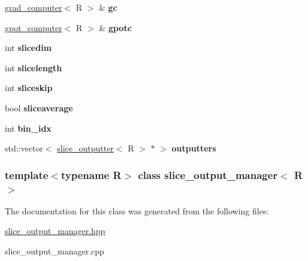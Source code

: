\begin{DoxyCompactItemize}
\item 
\hypertarget{classslice__output__manager_aef9191da41665323b7b552c1cac39025}{
\hyperlink{classgrad__computer}{grad\_\-computer}$<$ R $>$ \& {\bfseries gc}}
\label{classslice__output__manager_aef9191da41665323b7b552c1cac39025}

\item 
\hypertarget{classslice__output__manager_a4c23fefda63c2c5cb29f73d73374913e}{
\hyperlink{classgpot__computer}{gpot\_\-computer}$<$ R $>$ \& {\bfseries gpotc}}
\label{classslice__output__manager_a4c23fefda63c2c5cb29f73d73374913e}

\item 
\hypertarget{classslice__output__manager_ab53afdf80adec6a9a06869a11a9c6394}{
int {\bfseries slicedim}}
\label{classslice__output__manager_ab53afdf80adec6a9a06869a11a9c6394}

\item 
\hypertarget{classslice__output__manager_ab16957b5fabbc0068c33ac4bf431085d}{
int {\bfseries slicelength}}
\label{classslice__output__manager_ab16957b5fabbc0068c33ac4bf431085d}

\item 
\hypertarget{classslice__output__manager_aa01a399598c39945b501b1ff9d2a0829}{
int {\bfseries sliceskip}}
\label{classslice__output__manager_aa01a399598c39945b501b1ff9d2a0829}

\item 
\hypertarget{classslice__output__manager_afdd5365b8dcbf9a1e948c476cd28ecc2}{
bool {\bfseries sliceaverage}}
\label{classslice__output__manager_afdd5365b8dcbf9a1e948c476cd28ecc2}

\item 
\hypertarget{classslice__output__manager_a1fe93dc74b0853ed83416439e286d898}{
int {\bfseries bin\_\-idx}}
\label{classslice__output__manager_a1fe93dc74b0853ed83416439e286d898}

\item 
\hypertarget{classslice__output__manager_a3c7aaa9dec8709ad63c587816808d77b}{
std::vector$<$ \hyperlink{classslice__outputter}{slice\_\-outputter}$<$ R $>$ $\ast$ $>$ {\bfseries outputters}}
\label{classslice__output__manager_a3c7aaa9dec8709ad63c587816808d77b}

\end{DoxyCompactItemize}
\subsubsection*{template$<$typename R$>$ class slice\_\-output\_\-manager$<$ R $>$}



The documentation for this class was generated from the following files:\begin{DoxyCompactItemize}
\item 
\hyperlink{slice__output__manager_8hpp}{slice\_\-output\_\-manager.hpp}\item 
slice\_\-output\_\-manager.cpp\end{DoxyCompactItemize}
